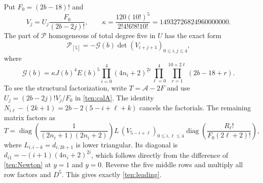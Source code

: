 \documentclass[11pt]{article}
\theoremstyle{definition}
\theoremstyle{remark}
\numberwithin{equation}{section}
\begin{document}
Put $F_0=(2b-18)!$ and
\[
 V_j=U_j\frac{F_0}{(2b-2j)!},\qquad
 \kappa=\frac{120(10!)^5}{2!4!6!8!10!}
         =14932726824960000000.
\]
The part of $\mathscr P$ homogeneous of total degree five in $U$
has the exact form
\begin{equation}\label{ten:leading}
 \mathscr P_{[5]}=-\mathscr G(b)\det(V_{i+j+1})_{0\le i,j\le4},
\end{equation}
where
\[
 \mathscr G(b)=\kappa J(b)^4E(b)^5
 \prod_{i=0}^{4}(4n_i+2)^{\underline{2i}}
 \prod_{\ell=0}^{4}\prod_{r=1}^{10+2\ell}(2b-18+r).
\]
To see the structural factorization, write
$T=\mathcal A-2F$ and use $U_j=(2b-2j)!V_j/F_0$ in
\eqref{ten:calA}.  The identity
$N_{i\ell}-(2k+1)=2b-2(5-i+\ell+k)$ cancels the factorials.
The remaining matrix factors as
\[
 T=\operatorname{diag}\!\left(\frac1{(2n_i+1)(2n_i+2)}\right)
       L\,(V_{5-i+\ell})_{0\le i,\ell\le4}
       \operatorname{diag}\!\left(\frac{R_\ell!}{F_0(2\ell+2)!}\right),
\]
where $L_{i,i-k}=d_{i,2k+1}$ is lower triangular.  Its diagonal is
$d_{i1}=-(i+1)(4n_i+2)^{\underline{2i}}$, which follows directly
from the difference of \eqref{ten:Newton} at $y=1$ and $y=0$.
Reverse the five middle rows and multiply all row factors and
$D^5$.  This gives exactly \eqref{ten:leading}.
\end{document}
